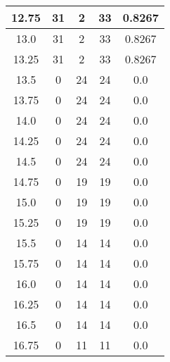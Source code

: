 \documentclass[letterpaper, 12pt]{article}
\begin{document}
\begin{longtable}{|c|c|c|c|c|}
\hline
12.75 & 31 & 2 & 33 & 0.8267 \\
\hline
13.0 & 31 & 2 & 33 & 0.8267 \\
\hline
13.25 & 31 & 2 & 33 & 0.8267 \\
\hline
13.5 & 0 & 24 & 24 & 0.0 \\
\hline
13.75 & 0 & 24 & 24 & 0.0 \\
\hline
14.0 & 0 & 24 & 24 & 0.0 \\
\hline
14.25 & 0 & 24 & 24 & 0.0 \\
\hline
14.5 & 0 & 24 & 24 & 0.0 \\
\hline
14.75 & 0 & 19 & 19 & 0.0 \\
\hline
15.0 & 0 & 19 & 19 & 0.0 \\
\hline
15.25 & 0 & 19 & 19 & 0.0 \\
\hline
15.5 & 0 & 14 & 14 & 0.0 \\
\hline
15.75 & 0 & 14 & 14 & 0.0 \\
\hline
16.0 & 0 & 14 & 14 & 0.0 \\
\hline
16.25 & 0 & 14 & 14 & 0.0 \\
\hline
16.5 & 0 & 14 & 14 & 0.0 \\
\hline
16.75 & 0 & 11 & 11 & 0.0 \\
\hline
\end{longtable}
\end{document}

